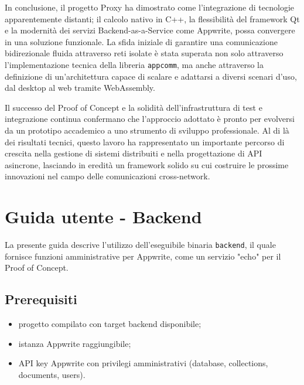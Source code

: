 \documentclass[a4paper, 11pt, twoside]{report}
\newif\ifshowlogo
\newcommand{\blankpage}{
    \clearpage
    \thispagestyle{empty}     %
    \showlogofalse            %
    \hbox{}                   %
    \newpage
    \showlogotrue             %
}
\begin{document}
In conclusione, il progetto Proxy ha dimostrato come l'integrazione di tecnologie apparentemente distanti; il calcolo nativo in C++, la flessibilità
del framework Qt e la modernità dei servizi Backend-as-a-Service come Appwrite, possa convergere in una soluzione funzionale.
La sfida iniziale di garantire una comunicazione bidirezionale fluida attraverso reti isolate è stata superata non solo attraverso l'implementazione
tecnica della libreria \texttt{appcomm}, ma anche attraverso la definizione di un'architettura capace di scalare e adattarsi a diversi scenari d'uso,
dal desktop al web tramite WebAssembly.

Il successo del Proof of Concept e la solidità dell'infrastruttura di test e integrazione continua confermano che l'approccio adottato è pronto per
evolversi da un prototipo accademico a uno strumento di sviluppo professionale.
Al di là dei risultati tecnici, questo lavoro ha rappresentato un importante percorso di crescita nella gestione di sistemi distribuiti e nella
progettazione di API asincrone, lasciando in eredità un framework solido su cui costruire le prossime innovazioni nel campo delle comunicazioni
cross-network.

\blankpage
{}
\printglossary[title=Glossario, toctitle=Glossario]

\blankpage
\printbibliography[heading=bibintoc, title=Sitografia]

\blankpage

\appendix
\chapter{Guida utente - Backend}\label{chp:backendguide}

La presente guida descrive l'utilizzo dell'eseguibile binaria \texttt{backend}, il quale fornisce funzioni amministrative per
Appwrite, come un servizio "echo" per il Proof of Concept.

\section{Prerequisiti}

\begin{itemize}
    \item progetto compilato con target backend disponibile;
    \item istanza Appwrite raggiungibile;
    \item API key Appwrite con privilegi amministrativi (database, collections, documents, users).
\end{itemize}
\end{document}
